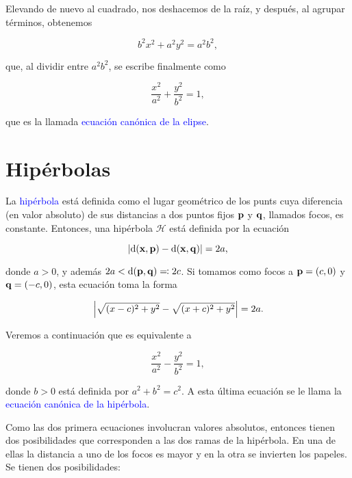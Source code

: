\documentclass{article}
\theoremstyle{definicion}
\theoremstyle{definition}             %
\theoremstyle{definition}             %
\theoremstyle{definition}
\theoremstyle{definition}
\theoremstyle{observacion}
\theoremstyle{definition}
\theoremstyle{plain}
\theoremstyle{definition}
\theoremstyle{afirmacion}
\theoremstyle{notation}
\theoremstyle{definition}
\begin{document}
    Elevando de nuevo al cuadrado, nos deshacemos de la raíz, y después, al agrupar términos, obtenemos

    \begin{equation*}
        b^{2}x^{2} + a^{2}y^{2} = a^{2}b^{2},
    \end{equation*}

    que, al dividir entre \(a^{2}b^{2}\), se escribe finalmente como

    \begin{equation*}
        \dfrac{x^{2}}{a^{2}} + \dfrac{y^{2}}{b^{2}} = 1,
    \end{equation*}

    que es la llamada \textcolor{blue}{ecuación canónica de la elipse}.

    \section{Hipérbolas}

    La \textcolor{blue}{hipérbola} está definida como el lugar geométrico de los punts cuya diferencia (en valor absoluto) de sus distancias a dos puntos fijos \(\vb{p}\) y \(\vb{q}\), llamados focos, es constante. Entonces, una hipérbola \(\mathcal{H}\) está definida por la ecuación

    \begin{equation*}
        \abs{\textrm{d}(\vb{x}, \vb{p}) - \textrm{d}(\vb{x}, \vb{q})} = 2a,
    \end{equation*}

    donde \(a > 0\), y además \(2a < \textrm{d}(\vb{p}, \vb{q}) \eqqcolon 2c\). Si tomamos como focos a \(\vb{p} = (c, 0)\) y \(\vb{q} = (-c, 0)\), esta ecuación toma la forma

    \begin{equation*}
        \abs{\sqrt{(x - c)^{2} + y^{2}} - \sqrt{(x + c)^{2} + y^{2}}} = 2a.
    \end{equation*}

    Veremos a continuación que es equivalente a 

    \begin{equation*}
        \dfrac{x^{2}}{a^{2}} - \dfrac{y^{2}}{b^{2}} = 1,
    \end{equation*}

    donde \(b > 0\) está definida por \(a^{2} + b^{2} = c^{2}\). A esta última ecuación se le llama la \textcolor{blue}{ecuación canónica de la hipérbola}.	

    Como las dos primera ecuaciones involucran valores absolutos, entonces tienen dos posibilidades que corresponden a las dos ramas de la hipérbola. En una de ellas la distancia a uno de los focos es mayor y en la otra se invierten los papeles. Se tienen dos posibilidades:
\end{document}

